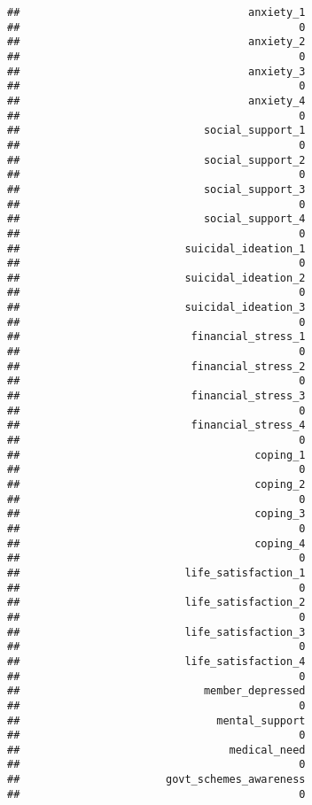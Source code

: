 \documentclass[
]{article}
\begin{document}
\begin{verbatim}
##                                    anxiety_1 
##                                            0 
##                                    anxiety_2 
##                                            0 
##                                    anxiety_3 
##                                            0 
##                                    anxiety_4 
##                                            0 
##                             social_support_1 
##                                            0 
##                             social_support_2 
##                                            0 
##                             social_support_3 
##                                            0 
##                             social_support_4 
##                                            0 
##                          suicidal_ideation_1 
##                                            0 
##                          suicidal_ideation_2 
##                                            0 
##                          suicidal_ideation_3 
##                                            0 
##                           financial_stress_1 
##                                            0 
##                           financial_stress_2 
##                                            0 
##                           financial_stress_3 
##                                            0 
##                           financial_stress_4 
##                                            0 
##                                     coping_1 
##                                            0 
##                                     coping_2 
##                                            0 
##                                     coping_3 
##                                            0 
##                                     coping_4 
##                                            0 
##                          life_satisfaction_1 
##                                            0 
##                          life_satisfaction_2 
##                                            0 
##                          life_satisfaction_3 
##                                            0 
##                          life_satisfaction_4 
##                                            0 
##                             member_depressed 
##                                            0 
##                               mental_support 
##                                            0 
##                                 medical_need 
##                                            0 
##                       govt_schemes_awareness 
##                                            0 

\end{verbatim}
\end{document}
